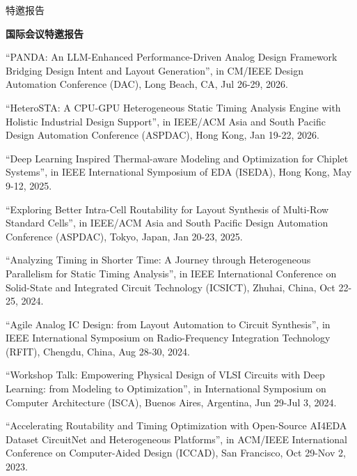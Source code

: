 \begin{rSection}{特邀报告}


\textbf{国际会议特邀报告}
        
\begin{description}[font=\normalfont]

\item[{[15]}]{
``PANDA: An LLM-Enhanced Performance-Driven Analog Design Framework Bridging Design Intent and Layout Generation'', in CM/IEEE Design Automation Conference (DAC), Long Beach, CA, Jul 26-29, 2026.
}

\item[{[14]}]{
``HeteroSTA: A CPU-GPU Heterogeneous Static Timing Analysis Engine with Holistic Industrial Design Support'', in IEEE/ACM Asia and South Pacific Design Automation Conference (ASPDAC), Hong Kong, Jan 19-22, 2026.
}

\item[{[13]}]{
``Deep Learning Inspired Thermal-aware Modeling and Optimization for Chiplet Systems'', in IEEE International Symposium of EDA (ISEDA), Hong Kong, May 9-12, 2025. 
}

\item[{[12]}]{
``Exploring Better Intra-Cell Routability for Layout Synthesis of Multi-Row Standard Cells'', in IEEE/ACM Asia and South Pacific Design Automation Conference (ASPDAC), Tokyo, Japan, Jan 20-23, 2025. 
}

\item[{[11]}]{
``Analyzing Timing in Shorter Time: A Journey through Heterogeneous Parallelism for Static Timing Analysis'', in IEEE International Conference on Solid-State and Integrated Circuit Technology (ICSICT), Zhuhai, China, Oct 22-25, 2024. 
}

\item[{[10]}]{
``Agile Analog IC Design: from Layout Automation to Circuit Synthesis'', in IEEE International Symposium on Radio-Frequency Integration Technology (RFIT), Chengdu, China, Aug 28-30, 2024. 
}

\item[{[9]}]{
``Workshop Talk: Empowering Physical Design of VLSI Circuits with Deep Learning: from Modeling to Optimization'', in International Symposium on Computer Architecture (ISCA), Buenos Aires, Argentina, Jun 29-Jul 3, 2024. 
}

\item[{[8]}]{
``Accelerating Routability and Timing Optimization with Open-Source AI4EDA Dataset CircuitNet and Heterogeneous Platforms'', in ACM/IEEE International Conference on Computer-Aided Design (ICCAD), San Francisco, Oct 29-Nov 2, 2023. 
}


\end{description}
\end{rSection}
